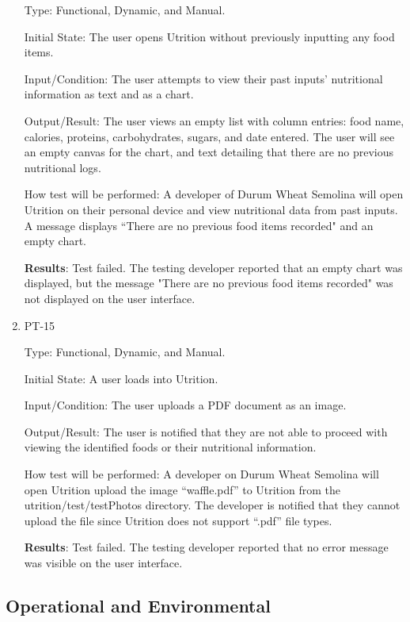 \documentclass[12pt, titlepage]{article}
\begin{document}
\begin{enumerate}
		Type: Functional, Dynamic, and Manual.
		
		Initial State: The user opens Utrition without previously inputting any food items.
		
		Input/Condition: The user attempts to view their past inputs' nutritional information as text and as a chart.
		
		Output/Result: The user views an empty list with column entries: food name, calories, proteins, carbohydrates, sugars, and date entered. The user will see an empty canvas for the chart, and text detailing that there are no previous nutritional logs.
		
		How test will be performed: A developer of Durum Wheat Semolina will open Utrition on their personal device and view nutritional data from past inputs. A message displays “There are no previous food items recorded" and an empty chart.
		
		\textbf{Results}: Test failed. The testing developer reported that an empty chart was displayed, but the message "There are no previous food items recorded" was not displayed on the user interface.
		
		\item{PT-15}
		
		Type: Functional, Dynamic, and Manual.
		
		Initial State: A user loads into Utrition.
		
		Input/Condition: The user uploads a PDF document as an image.
		
		Output/Result: The user is notified that they are not able to proceed with viewing the identified foods or their nutritional information.
		
		How test will be performed: A developer on Durum Wheat Semolina will open Utrition upload the image “waffle.pdf” to Utrition from the utrition/test/testPhotos directory. The developer is notified that they cannot upload the file since Utrition does not support “.pdf” file types.
		
		\textbf{Results}: Test failed. The testing developer reported that no error message was visible on the user interface.
		
	\end{enumerate}
	
	\subsection{Operational and Environmental}
	
\end{document}

